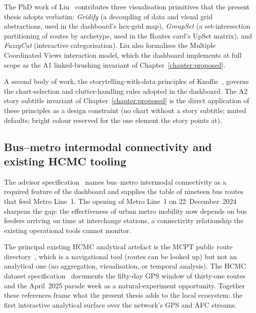 The PhD work of Liu~\cite{liu2022} contributes three
visualisation primitives that the present thesis adopts
verbatim: \emph{Gridify} (a decoupling of data and visual grid
abstractions, used in the dashboard's hex-grid map),
\emph{GroupSet} (a set-intersection partitioning of routes by
archetype, used in the Routes card's UpSet matrix), and
\emph{FuzzyCut} (interactive categorisation). Liu also formalises
the Multiple Coordinated Views interaction model, which the
dashboard implements at full scope as the A1 linked-brushing
invariant of Chapter~\ref{chapter:proposed}.

A second body of work, the storytelling-with-data principles of
Knaflic~\cite{knaflic2015}, governs the chart-selection and
clutter-handling rules adopted in the dashboard. The A2 story
subtitle invariant of Chapter~\ref{chapter:proposed} is the
direct application of these principles as a design constraint
(no chart without a story subtitle; muted defaults; bright colour
reserved for the one element the story points at).

\subsection{Bus--metro intermodal connectivity and existing
HCMC tooling}
\label{sec:background:related:hcmc}

The advisor specification~\cite{thoai2025} names bus--metro
intermodal connectivity as a required feature of the dashboard
and supplies the table of nineteen bus routes that feed Metro
Line~1. The opening of Metro Line~1 on
22~December~2024~\cite{metro_wiki} sharpens the gap: the
effectiveness of urban metro mobility now depends on bus feeders
arriving on time at interchange stations, a connectivity
relationship the existing operational tools cannot monitor.

The principal existing HCMC analytical artefact is the MCPT
public route directory~\cite{ttgtcc2024}, which is a
navigational tool (routes can be looked up) but not an
analytical one (no aggregation, visualisation, or temporal
analysis). The HCMC dataset specification~\cite{hcmcgps2025}
documents the fifty-day GPS window of thirty-one routes and the
April~2025 parade week as a natural-experiment opportunity.
Together these references frame what the present thesis adds to
the local ecosystem: the first interactive analytical surface
over the network's GPS and AFC streams.
